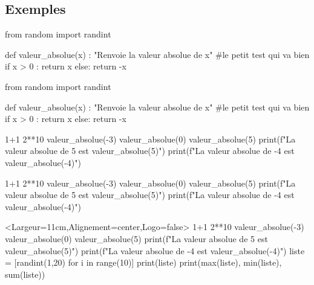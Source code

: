 \documentclass[french,a4paper,10pt]{article}
\begin{document}
\subsection{Exemples}

{\small \begin{codehigh}
\begin{python}
from random import randint

def valeur_absolue(x) :
    "Renvoie la valeur absolue de x"
    #le petit test qui va bien
    if x > 0 :
        return x
    else:
        return -x
\end{python}
\end{codehigh}}

\begin{python}
from random import randint

def valeur_absolue(x) :
	"Renvoie la valeur absolue de x"
	#le petit test qui va bien
	if x > 0 :
		return x
	else:
		return -x
\end{python}

{\small \begin{codehigh}
\begin{ConsolePiton}{}
1+1
2**10
valeur_absolue(-3)
valeur_absolue(0)
valeur_absolue(5)
print(f"La valeur absolue de 5 est {valeur_absolue(5)}")
print(f"La valeur absolue de -4 est {valeur_absolue(-4)}")
\end{ConsolePiton}
\end{codehigh}}

\begin{ConsolePiton}{}
1+1
2**10
valeur_absolue(-3)
valeur_absolue(0)
valeur_absolue(5)
print(f"La valeur absolue de 5 est {valeur_absolue(5)}")
print(f"La valeur absolue de -4 est {valeur_absolue(-4)}")
\end{ConsolePiton}

\pagebreak

{\small \begin{codehigh}
\begin{ConsolePiton}<Largeur=11cm,Alignement=center,Logo=false>{}
1+1
2**10
valeur_absolue(-3)
valeur_absolue(0)
valeur_absolue(5)
print(f"La valeur absolue de 5 est {valeur_absolue(5)}")
print(f"La valeur absolue de -4 est {valeur_absolue(-4)}")
liste = [randint(1,20) for i in range(10)]
print(liste)
print(max(liste), min(liste), sum(liste))
\end{ConsolePiton}
\end{codehigh}}
\end{document}
